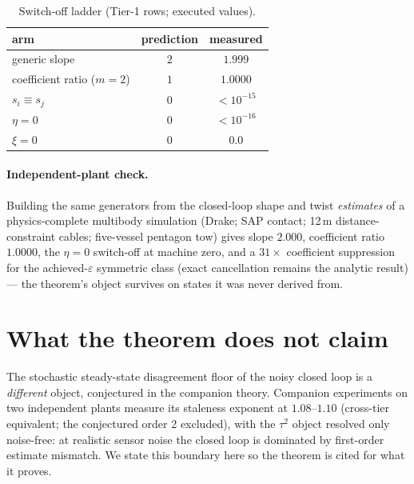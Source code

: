 \documentclass[letterpaper, 10pt, journal]{IEEEtran}
\begin{document}
\begin{table}[t]
\centering
\caption{Switch-off ladder (Tier-1 rows; executed values).}
\begin{tabular}{lcc}
\toprule
arm & prediction & measured \\
\midrule
generic slope & $2$ & $1.999$ \\
coefficient ratio ($m{=}2$) & $1$ & $1.0000$ \\
$s_i \equiv s_j$ & $0$ & $<10^{-15}$ \\
$\eta = 0$ & $0$ & $<10^{-16}$ \\
$\xi = 0$ & $0$ & $0.0$ \\
\bottomrule
\end{tabular}
\end{table}

\paragraph{Independent-plant check.} Building the same generators from the
closed-loop shape and twist \emph{estimates} of a physics-complete multibody
simulation (Drake; SAP contact; 12\,m distance-constraint cables; five-vessel
pentagon tow) gives slope $2.000$, coefficient ratio $1.0000$, the $\eta{=}0$
switch-off at machine zero, and a $31\times$ coefficient suppression for the
achieved-$\varepsilon$ symmetric class (exact cancellation remains the analytic
result) — the theorem's object survives on states it was never derived from.

\section{What the theorem does not claim}\label{sec:notclaim}
The stochastic steady-state disagreement floor of the noisy closed loop is a
\emph{different} object, conjectured in the companion theory. Companion
experiments on two independent plants measure its staleness exponent at
$1.08$--$1.10$ (cross-tier equivalent; the conjectured order 2 excluded), with
the $\tau^2$ object resolved only noise-free: at realistic sensor noise the
closed loop is dominated by first-order estimate mismatch. We state this
boundary here so the theorem is cited for what it proves.
\end{document}
